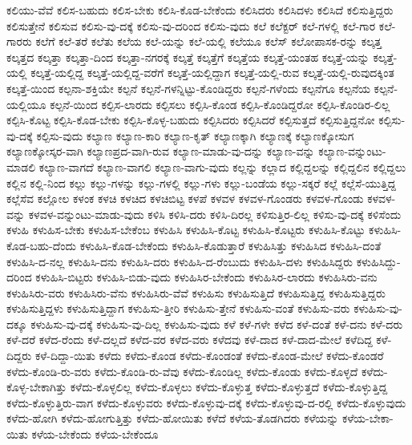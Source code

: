 {ಕಲಿಯು-ವೆವೆ
ಕಲಿಸ-ಬಹುದು
ಕಲಿಸ-ಬೇಕು
ಕಲಿಸಿ-ಕೊಡ-ಬೇಕೆಂದು
ಕಲಿಸಿದರು
ಕಲಿಸಿದಳು
ಕಲಿಸಿದೆ
ಕಲಿಸುತ್ತಿದ್ದರು
ಕಲಿಸುತ್ತೇನೆ
ಕಲಿಸುವ
ಕಲಿಸು-ವು-ದಕ್ಕೆ
ಕಲಿಸು-ವು-ದರಿಂದ
ಕಲಿಸು-ವುದು
ಕಲೆ
ಕಲೆಕ್ಟರ್
ಕಲೆ-ಗಳಲ್ಲಿ
ಕಲೆ-ಗಾರ
ಕಲೆ-ಗಾರರು
ಕಲೆಗೆ
ಕಲೆ-ತರೆ
ಕಲೆತು
ಕಲೆಯ
ಕಲೆ-ಯನ್ನು
ಕಲೆ-ಯಲ್ಲಿ
ಕಲೆಯೂ
ಕಲೆಸ್
ಕಲೋಪಾಸಕ-ರನ್ನು
ಕಲ್ಕತ್ತ
ಕಲ್ಕತ್ತದ
ಕಲ್ಕತ್ತಾ
ಕಲ್ಕತ್ತಾ-ದಿಂದ
ಕಲ್ಕತ್ತಾ-ನಗರಕ್ಕೆ
ಕಲ್ಕತ್ತೆ
ಕಲ್ಕತ್ತೆಗೆ
ಕಲ್ಕತ್ತೆಯ
ಕಲ್ಕತ್ತೆ-ಯಂತಹ
ಕಲ್ಕತ್ತೆ-ಯನ್ನು
ಕಲ್ಕತ್ತೆ-ಯಲ್ಲಿ
ಕಲ್ಕತ್ತೆ-ಯಲ್ಲಿದ್ದ
ಕಲ್ಕತ್ತೆ-ಯಲ್ಲಿದ್ದ-ವರೆಗೆ
ಕಲ್ಕತ್ತೆ-ಯಲ್ಲಿದ್ದಾಗ
ಕಲ್ಕತ್ತೆ-ಯಲ್ಲಿ-ರುವ
ಕಲ್ಕತ್ತೆ-ಯಲ್ಲಿ-ರುವುದಕ್ಕಿಂತ
ಕಲ್ಕತ್ತೆ-ಯಿಂದ
ಕಲ್ಪನಾ-ಶಕ್ತಿಯೇ
ಕಲ್ಪನೆ
ಕಲ್ಪನೆ-ಗಳನ್ನಿಟ್ಟು-ಕೊಂಡಿದ್ದರು
ಕಲ್ಪನೆ-ಗಳೆಂದು
ಕಲ್ಪನೆಗೂ
ಕಲ್ಪನೆಯ
ಕಲ್ಪನೆ-ಯಲ್ಲಿಯೂ
ಕಲ್ಪನೆ-ಯಿಂದ
ಕಲ್ಪಿಸ-ಲಾರದು
ಕಲ್ಪಿಸಲು
ಕಲ್ಪಿಸಿ-ಕೊಂಡ
ಕಲ್ಪಿಸಿ-ಕೊಂಡಿದ್ದರೋ
ಕಲ್ಪಿಸಿ-ಕೊಂಡಿರ-ಲಿಲ್ಲ
ಕಲ್ಪಿಸಿ-ಕೊಟ್ಟ
ಕಲ್ಪಿಸಿ-ಕೊಡ-ಬೇಕು
ಕಲ್ಪಿಸಿ-ಕೊಳ್ಳ-ಬಹುದು
ಕಲ್ಪಿಸಿದರು
ಕಲ್ಪಿಸಿದರೆ
ಕಲ್ಪಿಸುತ್ತದೆ
ಕಲ್ಪಿಸುತ್ತಿದ್ದನೋ
ಕಲ್ಪಿಸು-ವು-ದಕ್ಕೆ
ಕಲ್ಪಿಸು-ವುದು
ಕಲ್ಯಾಣ
ಕಲ್ಯಾಣ-ಕಾರಿ
ಕಲ್ಯಾಣ-ಕೃತ್
ಕಲ್ಯಾಣಕ್ಕಾಗಿ
ಕಲ್ಯಾಣಕ್ಕೆ
ಕಲ್ಯಾಣಕ್ಕೋಸುಗ
ಕಲ್ಯಾಣಕ್ಕೋಸ್ಕರ-ವಾಗಿ
ಕಲ್ಯಾಣಪ್ರದ-ವಾಗಿ-ರುವ
ಕಲ್ಯಾಣ-ಮಾಡು-ವು-ದನ್ನು
ಕಲ್ಯಾಣ-ವನ್ನು
ಕಲ್ಯಾಣ-ವನ್ನುಂಟು-ಮಾಡಲಿ
ಕಲ್ಯಾಣ-ವಾಗದೆ
ಕಲ್ಯಾಣ-ವಾಗಲಿ
ಕಲ್ಯಾಣ-ವಾಗು-ವುದು
ಕಲ್ಲನ್ನು
ಕಲ್ಲಾದ
ಕಲ್ಲಿದ್ದಲನ್ನು
ಕಲ್ಲಿದ್ದಲಿನ
ಕಲ್ಲಿದ್ದಲು
ಕಲ್ಲಿನ
ಕಲ್ಲಿ-ನಿಂದ
ಕಲ್ಲು
ಕಲ್ಲು-ಗಳನ್ನು
ಕಲ್ಲು-ಗಳಲ್ಲಿ
ಕಲ್ಲು-ಗಳು
ಕಲ್ಲು-ಬಂಡೆಯ
ಕಲ್ಲು-ಸಕ್ಕರೆ
ಕಲ್ಲೆ
ಕಲ್ಲೆಸೆ-ಯುತ್ತಿದ್ದ
ಕಲ್ಲೆಸೆವ
ಕಲ್ಲೋಲ
ಕಳಂಕ
ಕಳಚಿ
ಕಳಚಿದ
ಕಳಚಿಬಿಟ್ಟ
ಕಳಪೆ
ಕಳವಳ
ಕಳವಳ-ಗೊಂಡರು
ಕಳವಳ-ಗೊಂಡು
ಕಳವಳ-ವನ್ನು
ಕಳವಳ-ವನ್ನುಂಟು-ಮಾಡು-ವುದು
ಕಳಿಸಿ
ಕಳಿಸಿ-ದರು
ಕಳಿಸಿ-ದಿರಲ್ಲ
ಕಳಿಸುತ್ತಿರ-ಲಿಲ್ಲ
ಕಳಿಸು-ವು-ದಕ್ಕೆ
ಕಳಿಸೆಂದು
ಕಳುಹಿ
ಕಳುಹಿಸ-ಬೇಕು
ಕಳುಹಿಸ-ಬೇಕೆಂಬ
ಕಳುಹಿಸಿ
ಕಳುಹಿಸಿ-ಕೊಟ್ಟ
ಕಳುಹಿಸಿ-ಕೊಟ್ಟರು
ಕಳುಹಿಸಿ-ಕೊಟ್ಟು
ಕಳುಹಿಸಿ-ಕೊಡ-ಬಹು-ದೆಂದು
ಕಳುಹಿಸಿ-ಕೊಡ-ಬೇಕೆಂದು
ಕಳುಹಿಸಿ-ಕೊಡುತ್ತಾರೆ
ಕಳುಹಿಸಿತ್ತು
ಕಳುಹಿಸಿದ
ಕಳುಹಿಸಿ-ದಂತೆ
ಕಳುಹಿಸಿ-ದ-ನಲ್ಲ
ಕಳುಹಿಸಿ-ದನು
ಕಳುಹಿಸಿ-ದರು
ಕಳುಹಿಸಿ-ದ-ರೆಂಬುದು
ಕಳುಹಿಸಿ-ದಳು
ಕಳುಹಿಸಿದ್ದರು
ಕಳುಹಿಸಿದ್ದು-ದರಿಂದ
ಕಳುಹಿಸಿ-ಬಿಟ್ಟರು
ಕಳುಹಿಸಿ-ಬಿಡು-ವುದು
ಕಳುಹಿಸಿರ-ಬೇಕೆಂದು
ಕಳುಹಿಸಿರ-ಲಾರದು
ಕಳುಹಿಸಿರು-ವನು
ಕಳುಹಿಸಿರು-ವರು
ಕಳುಹಿಸಿರು-ವೆನು
ಕಳುಹಿಸಿರು-ವೆವೆ
ಕಳುಹಿಸು
ಕಳುಹಿಸುತ್ತಿದೆ
ಕಳುಹಿಸುತ್ತಿದ್ದ
ಕಳುಹಿಸುತ್ತಿದ್ದರು
ಕಳುಹಿಸುತ್ತಿದ್ದಳು
ಕಳುಹಿಸುತ್ತಿದ್ದಾಗ
ಕಳುಹಿಸು-ತ್ತೀರಿ
ಕಳುಹಿಸು-ತ್ತೇನೆ
ಕಳುಹಿಸು-ವಂತೆ
ಕಳುಹಿಸು-ವರು
ಕಳುಹಿಸು-ವು-ದಕ್ಕೂ
ಕಳುಹಿಸು-ವು-ದಕ್ಕೆ
ಕಳುಹಿಸು-ವು-ದಿಲ್ಲ
ಕಳುಹಿಸು-ವುದು
ಕಳೆ
ಕಳೆ-ಗಳೇ
ಕಳೆದ
ಕಳೆ-ದಂತೆ
ಕಳೆ-ದನು
ಕಳೆ-ದರು
ಕಳೆ-ದರೆ
ಕಳೆದ-ರೆಂದು
ಕಳೆ-ದಲ್ಲದೆ
ಕಳೆದ-ವರ
ಕಳೆದ-ವರು
ಕಳೆದವು
ಕಳೆ-ದಾದ
ಕಳೆ-ದಾದ-ಮೇಲೆ
ಕಳೆದಿದ್ದ
ಕಳೆ-ದಿದ್ದರು
ಕಳೆ-ದಿದ್ದಾ-ಯಿತು
ಕಳೆದು
ಕಳೆದು-ಕೊಂಡ
ಕಳೆದು-ಕೊಂಡಂತೆ
ಕಳೆದು-ಕೊಂಡ-ಮೇಲೆ
ಕಳೆದು-ಕೊಂಡರೆ
ಕಳೆದು-ಕೊಂಡಿ-ರು-ವರು
ಕಳೆದು-ಕೊಂಡಿ-ರು-ವೆವು
ಕಳೆದು-ಕೊಂಡಿಲ್ಲ
ಕಳೆದು-ಕೊಂಡು
ಕಳೆದು-ಕೊಳ್ಳದೆ
ಕಳೆದು-ಕೊಳ್ಳ-ಬೇಕಾಗಿತ್ತು
ಕಳೆದು-ಕೊಳ್ಳಲಿಲ್ಲ
ಕಳೆದು-ಕೊಳ್ಳಲು
ಕಳೆದು-ಕೊಳ್ಳುತ್ತ
ಕಳೆದು-ಕೊಳ್ಳುತ್ತದೆ
ಕಳೆದು-ಕೊಳ್ಳುತ್ತಿದ್ದ
ಕಳೆದು-ಕೊಳ್ಳುತ್ತಿರು-ವಾಗ
ಕಳೆದು-ಕೊಳ್ಳುವರು
ಕಳೆದು-ಕೊಳ್ಳುವು-ದಕ್ಕೆ
ಕಳೆದು-ಕೊಳ್ಳುವು-ದ-ರಲ್ಲಿ
ಕಳೆದು-ಕೊಳ್ಳುವುದು
ಕಳೆದು-ಹೋಗಿ
ಕಳೆದು-ಹೋಗುತ್ತಿತ್ತು
ಕಳೆದು-ಹೋಯಿತು
ಕಳೆದೆ
ಕಳೆಯ-ತೊಡಗಿದರು
ಕಳೆಯನ್ನು
ಕಳೆಯ-ಬೇಕಾ-ಯಿತು
ಕಳೆಯ-ಬೇಕೆಂದು
ಕಳೆಯ-ಬೇಕೆಂದೂ
}
